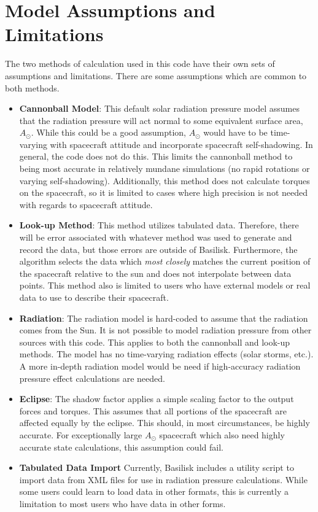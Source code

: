 \section{Model Assumptions and Limitations}
The two methods of calculation used in this code have their own sets of assumptions and limitations. There are some assumptions which are common to both methods.
\begin{itemize}
	\item \textbf{Cannonball Model}: This default solar radiation pressure model assumes that the radiation pressure will act normal to some equivalent surface area, $A_{\odot}$. While this could be a good assumption, $A_{\odot}$ would have to be time-varying with spacecraft attitude and incorporate spacecraft self-shadowing. In general, the code does not do this. This limits the cannonball method to being most accurate in relatively mundane simulations (no rapid rotations or varying self-shadowing). Additionally, this method does not calculate torques on the spacecraft, so it is limited to cases where high precision is not needed with regards to spacecraft attitude.
	\item \textbf{Look-up Method}: This method utilizes tabulated data. Therefore, there will be error associated with whatever method was used to generate and record the data, but those errors are outside of Basilisk. Furthermore, the algorithm selects the data which \textit{most closely} matches the current position of the spacecraft relative to the sun and does not interpolate between data points.  This method also is limited to users who have external models or real data to use to describe their spacecraft.
	\item \textbf{Radiation}: The radiation model is hard-coded to assume that the radiation comes from the Sun. It is not possible to model radiation pressure from other sources with this code. This applies to both the cannonball and look-up methods. The model has no time-varying radiation effects (solar storms, etc.). A more in-depth radiation model would be need if high-accuracy radiation pressure effect calculations are needed.
	\item \textbf{Eclipse}: The shadow factor applies a simple scaling factor to the output forces and torques. This assumes that all portions of the spacecraft are affected equally by the eclipse. This should, in most circumstances, be highly accurate. For exceptionally large $A_{\odot}$ spacecraft which also need highly accurate state calculations, this assumption could fail.
	\item \textbf{Tabulated Data Import} Currently, Basilisk includes a utility script to import data from XML files for use in radiation pressure calculations. While some users could learn to load data in other formats, this is currently a limitation to most users who have data in other forms.
\end{itemize}